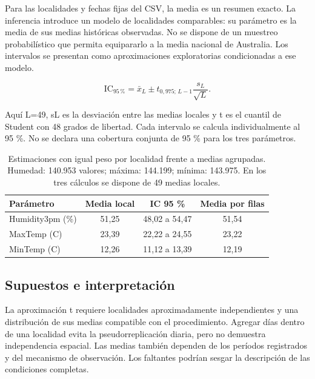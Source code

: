 \documentclass[11pt,a4paper]{article}
\begin{document}
Para las localidades y fechas fijas del CSV, la media es un resumen exacto. La inferencia introduce un modelo de localidades comparables: su parámetro es la media de sus medias históricas observadas. No se dispone de un muestreo probabilístico que permita equipararlo a la media nacional de Australia. Los intervalos se presentan como aproximaciones exploratorias condicionadas a ese modelo.


\[\mathrm{IC}_{95\,\%}=\bar{x}_{L}\pm t_{0{,}975;\,L-1}\frac{s_L}{\sqrt{L}}.\]

Aquí L=49, sL es la desviación entre las medias locales y t es el cuantil de Student con 48 grados de libertad. Cada intervalo se calcula individualmente al 95 \%. No se declara una cobertura conjunta de 95 \% para los tres parámetros.


\begin{table}[H]
\centering
\small
\renewcommand{\arraystretch}{1.18}
\setlength{\tabcolsep}{5pt}
\begin{tabularx}{\linewidth}{@{}Yccc@{}}
\toprule

\textbf{Parámetro} & \textbf{Media local} & \textbf{IC 95 \%} & \textbf{Media por filas} \\
\midrule

Humidity3pm (\%) & 51,25 & 48,02 a 54,47 & 51,54 \\

MaxTemp (\textdegree{}C) & 23,39 & 22,22 a 24,55 & 23,22 \\

MinTemp (\textdegree{}C) & 12,26 & 11,12 a 13,39 & 12,19 \\

\bottomrule
\end{tabularx}

\caption{Estimaciones con igual peso por localidad frente a medias agrupadas. Humedad: 140.953 valores; máxima: 144.199; mínima: 143.975. En los tres cálculos se dispone de 49 medias locales.}
\label{tab:6}

\end{table}

\subsection{Supuestos e interpretación}

La aproximación t requiere localidades aproximadamente independientes y una distribución de sus medias compatible con el procedimiento. Agregar días dentro de una localidad evita la pseudorreplicación diaria, pero no demuestra independencia espacial. Las medias también dependen de los períodos registrados y del mecanismo de observación. Los faltantes podrían sesgar la descripción de las condiciones completas.
\end{document}
